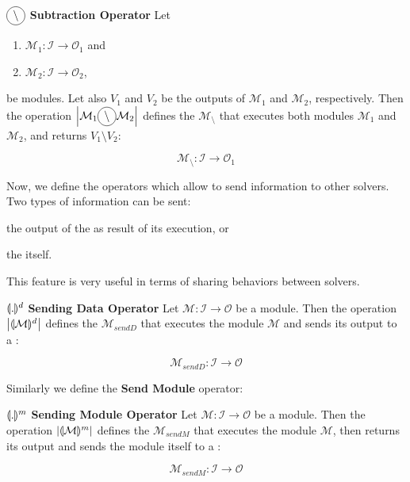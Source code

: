 \begin{definition}\label{op:subst}
$\circled{$\setminus$}$ {\bf Subtraction Operator} Let 
\begin{enumerate}%
	\item $\mathcal{M}_1 : \mathcal{I} \rightarrow \mathcal{O}_1$ and  
	\item $\mathcal{M}_2 : \mathcal{I} \rightarrow \mathcal{O}_2$,
\end{enumerate}%
be modules. %
Let also $V_1$ and $V_2$ be the outputs of $\mathcal{M}_1$ and $\mathcal{M}_2$, respectively. Then the operation $\left|\mathcal{M}_1\circled{$\setminus$}\mathcal{M}_2\right|$ defines the \cm{} $\mathcal{M}_{\setminus}$ that executes both modules $\mathcal{M}_1$ and $\mathcal{M}_2$, and returns $V_1 \setminus V_2$:

\[
\mathcal{M}_{\setminus}:\mathcal{I} \rightarrow \mathcal{O}_1
\]
\end{definition}

\separation

Now, we define the operators which allow to send information to other solvers. Two types of information can be sent: 
\begin{inparaenum}[i)]
	\item the output of the \om{} as result of its execution, or 
	\item the \om{} itself.
\end{inparaenum} This feature is very useful in terms of sharing behaviors between solvers.

\begin{definition}\label{op:osend}
$\llparenthesis.\rrparenthesis^d$ {\bf Sending Data Operator} Let $\mathcal{M} : \mathcal{I} \rightarrow \mathcal{O}$ be a module. Then the operation $\left|\llparenthesis\mathcal{M}\rrparenthesis^d\right|$ defines the \cm{} $\mathcal{M}_{sendD}$ that executes the module $\mathcal{M}$ and sends its output to a \opch:

\[
\mathcal{M}_{sendD}:\mathcal{I} \rightarrow \mathcal{O}
\]
\end{definition}

\separation

Similarly we define the \textbf{Send Module} operator:

\begin{definition}\label{op:msend}
$\llparenthesis.\rrparenthesis^m$ {\bf Sending Module Operator} Let $\mathcal{M} : \mathcal{I} \rightarrow \mathcal{O}$ be a module. Then the operation $\left|\llparenthesis\mathcal{M}\rrparenthesis^m\right|$ defines the \cm{} $\mathcal{M}_{sendM}$ that executes the module $\mathcal{M}$, then returns its output and sends the module itself to a \opch:

\[
\mathcal{M}_{sendM}:\mathcal{I} \rightarrow \mathcal{O}
\]
\end{definition}

